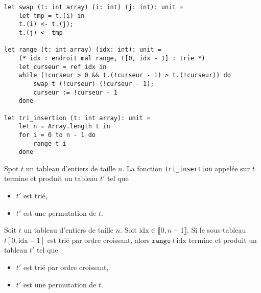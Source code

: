 \documentclass[a4paper]{article}
\begin{document}
	\begin{lstlisting}[language=caml,caption=Tri par insertion]
let swap (t: int array) (i: int) (j: int): unit =
	let tmp = t.(i) in
	t.(i) <- t.(j);
	t.(j) <- tmp

let range (t: int array) (idx: int): unit =
	(* idx : endroit mal range, t[0, idx - 1] : trie *)
	let curseur = ref idx in
	while (!curseur > 0 && t.(!curseur - 1) > t.(!curseur)) do
		swap t (!curseur) (!curseur - 1);
		curseur := !curseur - 1
	done

let tri_insertion (t: int array): unit =
	let n = Array.length t in
	for i = 0 to n - 1 do
		range t i
	done
	\end{lstlisting}

	\begin{prop}
		Spot $t$ un tableau d'entiers de taille $n$.
		La fonction \texttt{tri\_insertion} appelée sur $t$ termine et produit un tableau $t'$ tel que
		\begin{itemize}
			\item $t'$ est trié,
			\item $t'$ est une permutation de $t$.
		\end{itemize}
	\end{prop}

	\begin{prop}
		Soit $t$ un tableau d'entiers de taille $n$.
		Soit $\mathrm{idx} \in \llbracket 0,n-1 \rrbracket$.
		Si le sous-tableau $t[0,\mathrm{idx} - 1]$ est trié par ordre croissant, alors $\texttt{range}\ t\ \mathrm{idx}$\/ termine et produit un tableau $t'$ tel que
		\begin{itemize}
			\item $t'$ est trié par ordre croissant,
			\item $t'$ est une permutation de $t$.
		\end{itemize}
	\end{prop}
\end{document}
